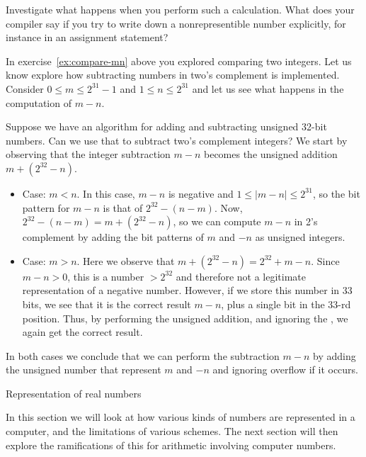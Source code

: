 \begin{exercise}
  Investigate what happens when you perform such a calculation. What
  does your compiler say if you try to write down a nonrepresentible
  number explicitly, for instance in an assignment statement?
\end{exercise}

In exercise~\ref{ex:compare-mn} above you explored comparing two integers.
Let us know explore how 
subtracting numbers in two's complement is implemented. Consider $0\leq
m\leq 2^{31}-1$ and $1\leq n\leq 2^{31}$ and let us see what happens
in the computation of $m-n$. 

Suppose we have an algorithm for adding and subtracting unsigned
32-bit numbers. Can we use that to subtract two's complement integers?
We start by observing that the integer subtraction $m-n$ becomes the
unsigned addition $m+(2^{32}-n)$.
\begin{itemize}
\item Case: $m<n$. In this case, $m-n$ is negative and $1\leq
  |m-n|\leq 2^{31}$, so the bit pattern for $m-n$ is that of
  $2^{32}-(n-m)$. Now, $2^{32}-(n-m)=m+(2^{32}-n)$, so we can compute
  $m-n$ in 2's complement by adding the bit patterns of $m$ and $-n$ as
  unsigned integers.
\item Case: $m>n$. Here we observe that
  $m+(2^{32}-n)=2^{32}+m-n$. Since $m-n>0$, this is a number $>2^{32}$
  and therefore not a legitimate
  representation of a negative number. However, if we store this
  number in 33 bits, we see that it is
  the correct result $m-n$, plus a single bit in the
  33-rd position. Thus, by performing the unsigned addition, and
  ignoring the , we again get the correct result.
\end{itemize}
In both cases we conclude that we can perform the subtraction $m-n$ by adding
the unsigned number that represent $m$ and $-n$
and ignoring overflow if it occurs.

 {Representation of real numbers}
\label{sec:float-representation}

In this section we will look at how various kinds of numbers are
represented in a computer, and the limitations of various schemes. The
next section will then explore the ramifications of this for arithmetic
involving computer numbers.

